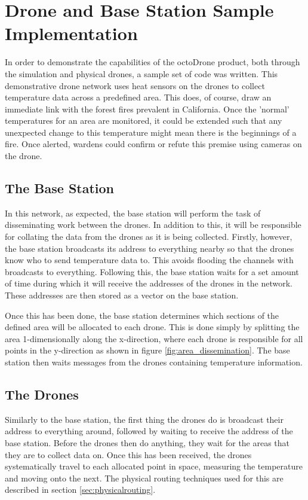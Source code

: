 \section{Drone and Base Station Sample Implementation}
In order to demonstrate the capabilities of the octoDrone product, both through the simulation and physical drones, a sample set of code was written. This demonstrative drone network uses heat sensors on the drones to collect temperature data across a predefined area. This does, of course, draw an immediate link with the forest fires prevalent in California. Once the 'normal' temperatures for an area are monitored, it could be extended such that any unexpected change to this temperature might mean there is the beginnings of a fire. Once alerted, wardens could confirm or refute this premise using cameras on the drone.

\subsection{The Base Station}
In this network, as expected, the base station will perform the task of disseminating work between the drones. In addition to this, it will be responsible for collating the data from the drones as it is being collected. Firstly, however, the base station broadcasts its address to everything nearby so that the drones know who to send temperature data to. This avoids flooding the channels with broadcasts to everything. Following this, the base station waits for a set amount of time during which it will receive the addresses of the drones in the network. These addresses are then stored as a vector on the base station.

Once this has been done, the base station determines which sections of the defined area will be allocated to each drone. This is done simply by splitting the area 1-dimensionally along the x-direction, where each drone is responsible for all points in the y-direction as shown in figure \ref{fig:area_dissemination}. The base station then waits messages from the drones containing temperature information.

\subsection{The Drones}
Similarly to the base station, the first thing the drones do is broadcast their address to everything around, followed by waiting to receive the address of the base station. Before the drones then do anything, they wait for the areas that they are to collect data on. Once this has been received, the drones systematically travel to each allocated point in space, measuring the temperature and moving onto the next. The physical routing techniques used for this are described in section \ref{sec:physicalrouting}.

